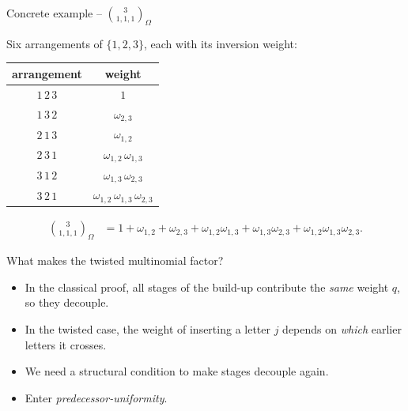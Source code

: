 \documentclass{beamer}
\renewcommand{\>}{\rangle}
\newcommand{\<}{\langle}
\begin{document}
\begin{frame}{Concrete example -- $\binom{3}{1,1,1}_\Omega$}

Six arrangements of $\{1,2,3\}$, each with its inversion weight:

\medskip
\begin{center}
\begin{tabular}{c@{\quad}c}
\toprule
arrangement & weight \\
\midrule
$1\,2\,3$ & $1$ \\
$1\,3\,2$ & $\omega_{2,3}$ \\
$2\,1\,3$ & $\omega_{1,2}$ \\
$2\,3\,1$ & $\omega_{1,2}\,\omega_{1,3}$ \\
$3\,1\,2$ & $\omega_{1,3}\,\omega_{2,3}$ \\
$3\,2\,1$ & $\omega_{1,2}\,\omega_{1,3}\,\omega_{2,3}$ \\
\bottomrule
\end{tabular}
\end{center}

\medskip
\begin{align*}
\binom{3}{1,1,1}_\Omega 
&=
1 + \omega_{1,2} + \omega_{2,3} + \omega_{1,2}\omega_{1,3} 
+ \omega_{1,3}\omega_{2,3} + \omega_{1,2}\omega_{1,3}\omega_{2,3}.
\end{align*}

\end{frame}


\begin{frame}{What makes the twisted multinomial factor?}

\begin{itemize}
    \item In the classical proof, all stages of the build-up
    contribute the \emph{same} weight $q$, so they decouple.

    \bigskip
    \item In the twisted case, the weight of inserting a letter $j$
    depends on \emph{which} earlier letters it crosses.

    \bigskip
    \item We need a structural condition to make stages decouple again.

    \bigskip
    \item Enter \emph{predecessor-uniformity}.
\end{itemize}
\end{frame}

\end{document}
